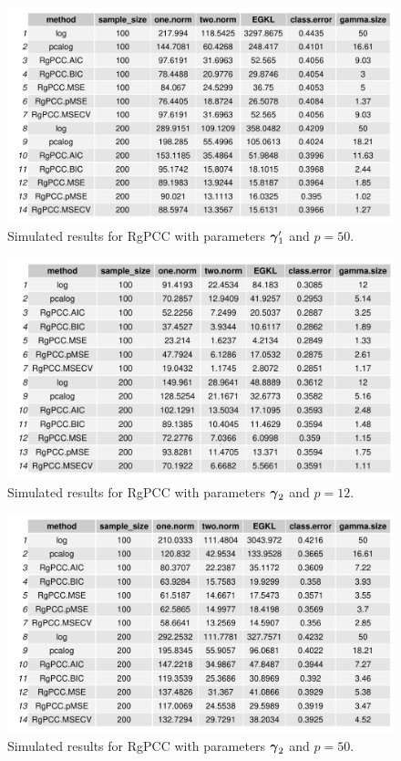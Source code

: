 \documentclass[main.tex]{subfiles}
\begin{document}
\begin{figure}[H]
	\centering
	\includegraphics[width =  \textwidth]{simulated/(sparsity1-nonlead,50)_metrics.pdf}
	\caption{Simulated results for RgPCC with parameters $\boldsymbol \gamma_1'$ and $p = 50$.}
	\label{fig:simulated1-50-nonlead}
\end{figure}

\begin{figure}[H]
	\centering
	\includegraphics[width =  \textwidth]{simulated/(sparsity3,12)_metrics.pdf}
	\caption{Simulated results for RgPCC with parameters $\boldsymbol \gamma_2$ and $p = 12$.}
	\label{fig:simulated3-12}
\end{figure}

\begin{figure}[H]
	\centering
	\includegraphics[width =  \textwidth]{simulated/(sparsity3,50)_metrics.pdf}
	\caption{Simulated results for RgPCC with parameters $\boldsymbol \gamma_2$ and $p = 50$.}
	\label{fig:simulated3-50}
\end{figure}
\end{document}

